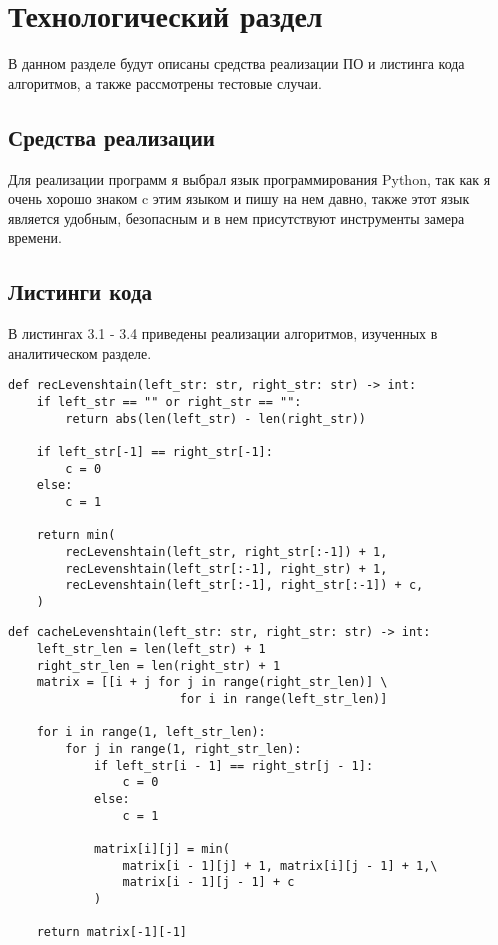 \chapter{Технологический раздел}

В данном разделе будут описаны средства реализации ПО и листинга кода алгоритмов, а также рассмотрены тестовые случаи.

\section{Средства реализации} 

Для реализации программ я выбрал язык программирования Python, так как я очень хорошо знаком c этим языком и пишу на нем давно, также этот язык является удобным, безопасным и в нем присутствуют инструменты замера времени.

\section{Листинги кода}

В листингах 3.1 - 3.4 приведены реализации алгоритмов, изученных в аналитическом разделе.

\captionsetup{singlelinecheck = false, justification=raggedright}
\begin{lstlisting}[label=recLevenshtain, caption=Рекурсивный Левенштейн]
def recLevenshtain(left_str: str, right_str: str) -> int:
    if left_str == "" or right_str == "":
        return abs(len(left_str) - len(right_str))

    if left_str[-1] == right_str[-1]:
        c = 0
    else:
        c = 1

    return min(
        recLevenshtain(left_str, right_str[:-1]) + 1,
        recLevenshtain(left_str[:-1], right_str) + 1,
        recLevenshtain(left_str[:-1], right_str[:-1]) + c,
    )
\end{lstlisting}

\captionsetup{singlelinecheck = false, justification=raggedright}
\begin{lstlisting}[label=cacheLevenshtain, caption=Кеширующий Левенштейн]
def cacheLevenshtain(left_str: str, right_str: str) -> int:
    left_str_len = len(left_str) + 1
    right_str_len = len(right_str) + 1
    matrix = [[i + j for j in range(right_str_len)] \
                        for i in range(left_str_len)]

    for i in range(1, left_str_len):
        for j in range(1, right_str_len):
            if left_str[i - 1] == right_str[j - 1]:
                c = 0
            else:
                c = 1

            matrix[i][j] = min(
                matrix[i - 1][j] + 1, matrix[i][j - 1] + 1,\
                matrix[i - 1][j - 1] + c
            )

    return matrix[-1][-1]
\end{lstlisting}

